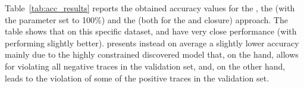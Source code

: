 Table~\ref{tab:acc_results} reports the obtained accuracy values for the \decminer, the \declareminer (with the  parameter set to 100\%) and the \nd (both for the \minclos and \subsetclos closure) approach. The table shows that on this specific dataset, \nd and \decminer have very close performance (with \nd \minclos performing slightly better). \declareminer presents instead on average a slightly lower accuracy mainly due to the highly constrained discovered model that, on the hand, allows for violating all negative traces in the validation set, and, on the other hand, leads to the violation of some of the positive traces in the validation set.

\begin{table} [h]
	\centering
		\caption{Accuracy results obtained with \declareminer, \decminer and \nd}
		\label{tab:acc_results}
\end{table}


